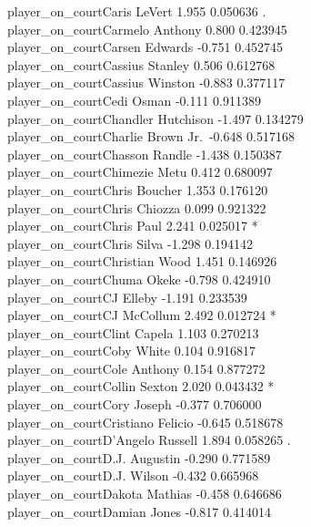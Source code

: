 \documentclass[
  landscape]{article}
\begin{document}
player\_on\_courtCaris LeVert 1.955 0.050636 .\\
player\_on\_courtCarmelo Anthony 0.800 0.423945\\
player\_on\_courtCarsen Edwards -0.751 0.452745\\
player\_on\_courtCassius Stanley 0.506 0.612768\\
player\_on\_courtCassius Winston -0.883 0.377117\\
player\_on\_courtCedi Osman -0.111 0.911389\\
player\_on\_courtChandler Hutchison -1.497 0.134279\\
player\_on\_courtCharlie Brown Jr.~-0.648 0.517168\\
player\_on\_courtChasson Randle -1.438 0.150387\\
player\_on\_courtChimezie Metu 0.412 0.680097\\
player\_on\_courtChris Boucher 1.353 0.176120\\
player\_on\_courtChris Chiozza 0.099 0.921322\\
player\_on\_courtChris Paul 2.241 0.025017 *\\
player\_on\_courtChris Silva -1.298 0.194142\\
player\_on\_courtChristian Wood 1.451 0.146926\\
player\_on\_courtChuma Okeke -0.798 0.424910\\
player\_on\_courtCJ Elleby -1.191 0.233539\\
player\_on\_courtCJ McCollum 2.492 0.012724 *\\
player\_on\_courtClint Capela 1.103 0.270213\\
player\_on\_courtCoby White 0.104 0.916817\\
player\_on\_courtCole Anthony 0.154 0.877272\\
player\_on\_courtCollin Sexton 2.020 0.043432 *\\
player\_on\_courtCory Joseph -0.377 0.706000\\
player\_on\_courtCristiano Felicio -0.645 0.518678\\
player\_on\_courtD'Angelo Russell 1.894 0.058265 .\\
player\_on\_courtD.J. Augustin -0.290 0.771589\\
player\_on\_courtD.J. Wilson -0.432 0.665968\\
player\_on\_courtDakota Mathias -0.458 0.646686\\
player\_on\_courtDamian Jones -0.817 0.414014\\
\end{document}
